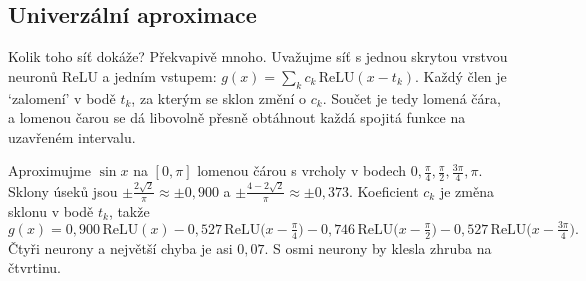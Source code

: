 \subsection{Univerzální aproximace}

Kolik toho síť dokáže? Překvapivě mnoho. Uvažujme síť s jednou skrytou vrstvou neuronů ReLU a jedním vstupem: $g(x) = \sum_k c_k\,\mathrm{ReLU}(x - t_k)$. Každý člen je `zalomení' v bodě $t_k$, za kterým se sklon změní o $c_k$. Součet je tedy lomená čára, a lomenou čarou se dá libovolně přesně obtáhnout každá spojitá funkce na uzavřeném intervalu.

\begin{example}
  Aproximujme $\sin x$ na $[0, \pi]$ lomenou čárou s vrcholy v bodech $0, \frac{\pi}{4}, \frac{\pi}{2}, \frac{3\pi}{4}, \pi$. Sklony úseků jsou $\pm\frac{2\sqrt{2}}{\pi}\approx\pm 0{,}900$ a $\pm\frac{4 - 2\sqrt{2}}{\pi}\approx\pm 0{,}373$. Koeficient $c_k$ je změna sklonu v bodě $t_k$, takže
  \begin{equation*}
    g(x) = 0{,}900\,\mathrm{ReLU}(x) - 0{,}527\,\mathrm{ReLU}\big(x - \tfrac{\pi}{4}\big) - 0{,}746\,\mathrm{ReLU}\big(x - \tfrac{\pi}{2}\big) - 0{,}527\,\mathrm{ReLU}\big(x - \tfrac{3\pi}{4}\big).
  \end{equation*}
  Čtyři neurony a největší chyba je asi $0{,}07$. S osmi neurony by klesla zhruba na čtvrtinu.
\end{example}

\begin{center}
\end{center}

